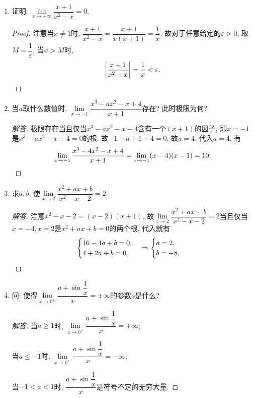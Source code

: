 \documentclass[a4paper,11pt,twoside]{ctexbook}
\begin{document}
\begin{enumerate}
	\item 证明: $\lim\limits_{x\to+\infty} \dfrac{x+1}{x^2-x}=0$.
	      \begin{proof}
		      注意当$x\neq 1$时, $\dfrac{x+1}{x^2-x}=\dfrac{x+1}{x(x+1)}=\dfrac{1}{x}$. 故对于任意给定的$\varepsilon>0$, 取$M=\dfrac{1}{\varepsilon}$, 当$x>M$时,
		      \[
			      \left|\dfrac{x+1}{x^2-x}\right|=\dfrac{1}{x}<\varepsilon. \qedhere
		      \]
	      \end{proof}

	\item 当$a$取什么数值时, $\lim\limits_{x\to -1} \dfrac{x^3-ax^2-x+4}{x+1}$存在? 此时极限为何?
	      \begin{proof}[解答]
		      极限存在当且仅当$x^3-ax^2-x+4$含有一个$(x+1)$的因子, 即$x=-1$是$x^3-ax^2-x+4=0$的根. 故$-1-a+1+4=0$, 故$a=4$.
		      代入$a=4$, 有
		      \[
			      \lim\limits_{x\to -1} \dfrac{x^3-4x^2-x+4}{x+1}=\lim\limits_{x\to -1} (x-4)(x-1)=10. \qedhere
		      \]
	      \end{proof}

	\item 求$a,b$, 使$\lim\limits_{x\to 2} \dfrac{x^2+ax+b}{x^2-x-2}=2$.
	      \begin{proof}[解答]
		      注意$x^2-x-2=(x-2)(x+1)$, 故$\lim\limits_{x\to 2} \dfrac{x^2+ax+b}{x^2-x-2}=2$当且仅当$x=-4, x=2$是$x^2+ax+b=0$的两个根, 代入就有
		      \[
			      \begin{cases} 16-4a+b=0, \\ 4+2a+b=0. \end{cases} \Rightarrow \begin{cases} a=2,\\ b=-8. \end{cases} \qedhere
		      \]
	      \end{proof}

	\item 问: 使得$\lim\limits_{x\to 0^{+}} \dfrac{a+\sin{\dfrac{1}{x}}}{x}=\pm\infty$的参数$a$是什么?
	      \begin{proof}[解答]
		      当$a\geqslant 1$时, $\lim\limits_{x\to 0^{+}} \dfrac{a+\sin{\dfrac{1}{x}}}{x}=+\infty$;

		      当$a\leqslant -1$时, $\lim\limits_{x\to 0^{+}} \dfrac{a+\sin{\dfrac{1}{x}}}{x}=-\infty$;

		      当$-1<a<1$时, $\dfrac{a+\sin{\dfrac{1}{x}}}{x}$是符号不定的无穷大量. \qedhere
	      \end{proof}


\end{enumerate}
\end{document}
